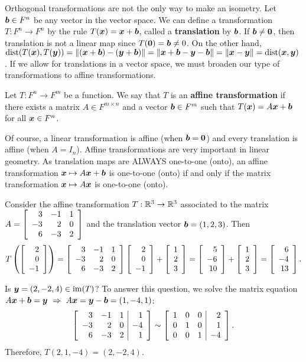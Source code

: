 Orthogonal transformations are not the only way to make an isometry. Let $\bb b\in F^n$ be any vector in the vector space. We can define a transformation $T:F^n\to F^n$ by the rule $T(\bb x) = \bb x+\bb b$, called a \textbf{translation} by $\bb b$. If $\bb b\neq \bb 0$, then translation is not a linear map since $T(\bb 0) = \bb b \neq 0$. On the other hand, $\dist(T(\bb x), T(\bb y)) = \Vert (\bb x+\bb b) - (\bb y+\bb b)\Vert = \Vert \bb x+\bb b - \bb y-\bb b\Vert = \Vert \bb x - \bb y\Vert = \dist(\bb x, \bb y)$. If we allow for translations in a vector space, we must broaden our type of transformations to affine transformations.\\

\begin{Def} Let $T : F^n\to F^m$ be a function. We say that $T$ is an \textbf{affine transformation} if there exists a matrix $A\in F^{m\times n}$ and a vector $\bb b\in F^m$ such that $T(\bb x) = A\bb x+\bb b$ for all $\bb x\in F^n$.
\end{Def}\vs

Of course, a linear transformation is affine (when $\bb b=\bb 0$) and every translation is affine (when $A=I_n$). Affine transformations are very important in linear geometry. As translation maps are ALWAYS one-to-one (onto), an affine transformation $\bb x\mapsto A\bb x+\bb b$ is one-to-one (onto) if and only if the matrix transformation $\bb x\mapsto A\bb x$ is one-to-one (onto).\\

\begin{Exam}\label{exam:affine} Consider the affine transformation $T : \R^3\to \R^3$ associated to the matrix $A = \mtx{rrr}{3&-1&1\\-3&2&0\\6&-3&2}$ and the translation vector $\bb b = (1, 2, 3)$. Then \[T\left(\vr{2\\0\\-1}\right) = \mtx{rrr}{3&-1&1\\-3&2&0\\6&-3&2}\vr{2\\0\\-1} + \vr{1\\2\\3} = \vr{5\\-6\\10} + \vr{1\\2\\3} = \vr{6\\-4\\13}.\]\vs

Is $\bb y = (2, -2, 4) \in \im(T)$? To answer this question, we solve the matrix equation $A\bb x + \bb b = \bb y\ \Rightarrow\ A\bb x = \bb y-\bb b = (1,-4,1)$:
\[\mtx{rrr|r}{3&-1&1&1\\-3&2&0&-4\\6&-3&2&1}\sim \mtx{rrr|r}{1&0&0&2\\0&1&0&1\\0&0&1&-4}.\] Therefore, $T(2,1,-4) = (2,-2,4)$.
\end{Exam}\vs

